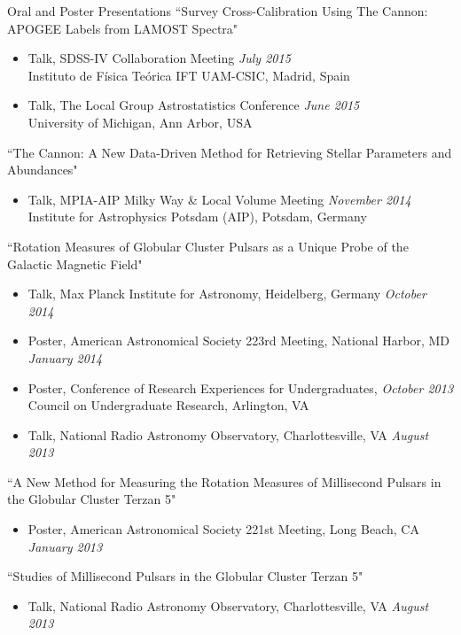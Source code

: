 \documentclass{resume} %
\begin{document}
\begin{rSection}{Oral and Poster Presentations}
``Survey Cross-Calibration Using The Cannon: APOGEE Labels from LAMOST Spectra"
\begin{itemize}
\item
Talk, SDSS-IV Collaboration Meeting \hfill {\em July 2015} \\
Instituto de Física Teórica IFT UAM-CSIC, Madrid, Spain
\item
Talk, The Local Group Astrostatistics Conference \hfill {\em June 2015} \\
University of Michigan, Ann Arbor, USA
\end{itemize}

``The Cannon: A New Data-Driven Method for Retrieving Stellar Parameters and Abundances"
\begin{itemize}
\item
Talk, MPIA-AIP Milky Way \& Local Volume Meeting  \hfill {\em November 2014} \\
Institute for Astrophysics Potsdam (AIP), Potsdam, Germany
\end{itemize}

``Rotation Measures of Globular Cluster Pulsars as a Unique Probe of the Galactic Magnetic Field"
\begin{itemize}
\item
Talk, Max Planck Institute for Astronomy,
Heidelberg, Germany \hfill {\em October 2014}
\item
Poster, American Astronomical Society 223rd Meeting, 
National Harbor, MD \hfill {\em January 2014}
\item
Poster, Conference of Research Experiences for Undergraduates, \hfill {\em October 2013}\\
Council on Undergraduate Research, Arlington, VA 
\item
Talk, National Radio Astronomy Observatory, 
Charlottesville, VA \hfill {\em August 2013} 
\end{itemize}

``A New Method for Measuring the Rotation Measures of Millisecond Pulsars in the Globular Cluster Terzan 5" 
\begin{itemize}
\item
Poster, American Astronomical Society 221st Meeting, 
Long Beach, CA \hfill {\em January 2013}
\end{itemize}

``Studies of Millisecond Pulsars in the Globular Cluster Terzan 5" 
\begin{itemize}
\item
Talk, National Radio Astronomy Observatory, 
Charlottesville, VA \hfill {\em August 2013} 
\end{itemize}

\end{rSection}
\end{document}

